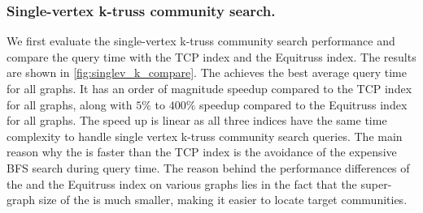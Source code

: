\subsubsection{Single-vertex k-truss community search.}
\label{eval_singlev_k_compare}

We first evaluate the single-vertex k-truss community search performance and compare the query time with the TCP index and the Equitruss index. The results are shown in \autoref{fig:singlev_k_compare}. The \twolevelindex{} achieves the best average query time for all graphs. It has an order of magnitude speedup compared to the TCP index for all graphs, along with $5\%$ to $400\%$ speedup compared to the Equitruss index for all graphs. The speed up is linear as all three indices have the same time complexity to handle single vertex k-truss community search queries. 
The main reason why the \twolevelindex{} is faster than the TCP index is the avoidance of the expensive BFS search during query time. The reason behind the performance differences of the \twolevelindex{} and the Equitruss index on various graphs lies in the fact that the super-graph size of the \twolevelindex{} is much smaller, making it easier to locate target communities.

